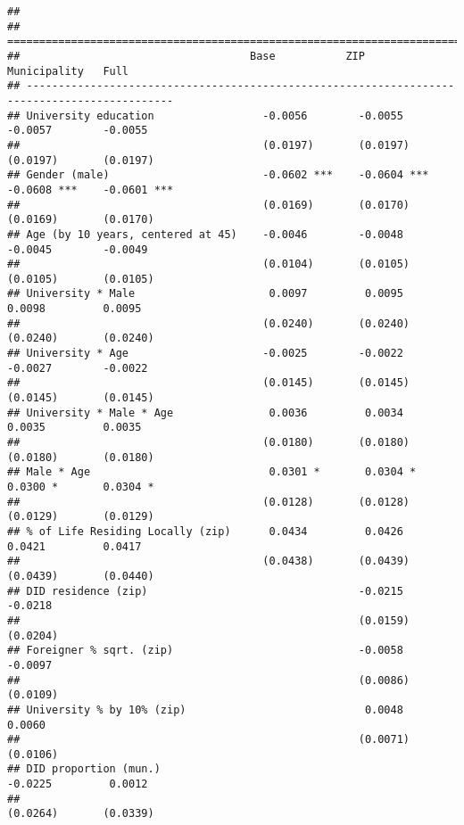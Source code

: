 \documentclass[
]{article}
\begin{document}
\begin{verbatim}
## 
## =============================================================================================
##                                    Base           ZIP            Municipality   Full         
## ---------------------------------------------------------------------------------------------
## University education                 -0.0056        -0.0055        -0.0057        -0.0055    
##                                      (0.0197)       (0.0197)       (0.0197)       (0.0197)   
## Gender (male)                        -0.0602 ***    -0.0604 ***    -0.0608 ***    -0.0601 ***
##                                      (0.0169)       (0.0170)       (0.0169)       (0.0170)   
## Age (by 10 years, centered at 45)    -0.0046        -0.0048        -0.0045        -0.0049    
##                                      (0.0104)       (0.0105)       (0.0105)       (0.0105)   
## University * Male                     0.0097         0.0095         0.0098         0.0095    
##                                      (0.0240)       (0.0240)       (0.0240)       (0.0240)   
## University * Age                     -0.0025        -0.0022        -0.0027        -0.0022    
##                                      (0.0145)       (0.0145)       (0.0145)       (0.0145)   
## University * Male * Age               0.0036         0.0034         0.0035         0.0035    
##                                      (0.0180)       (0.0180)       (0.0180)       (0.0180)   
## Male * Age                            0.0301 *       0.0304 *       0.0300 *       0.0304 *  
##                                      (0.0128)       (0.0128)       (0.0129)       (0.0129)   
## % of Life Residing Locally (zip)      0.0434         0.0426         0.0421         0.0417    
##                                      (0.0438)       (0.0439)       (0.0439)       (0.0440)   
## DID residence (zip)                                 -0.0215                       -0.0218    
##                                                     (0.0159)                      (0.0204)   
## Foreigner % sqrt. (zip)                             -0.0058                       -0.0097    
##                                                     (0.0086)                      (0.0109)   
## University % by 10% (zip)                            0.0048                        0.0060    
##                                                     (0.0071)                      (0.0106)   
## DID proportion (mun.)                                              -0.0225         0.0012    
##                                                                    (0.0264)       (0.0339)   

\end{verbatim}
\end{document}
